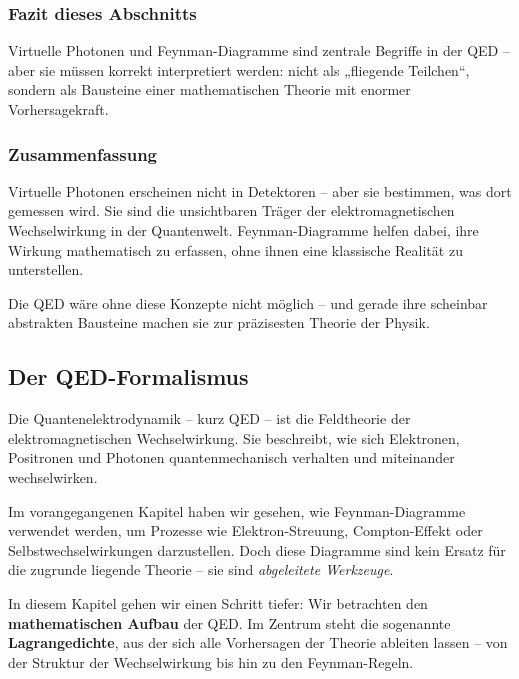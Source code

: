 \subsubsection*{Fazit dieses Abschnitts}
Virtuelle Photonen und Feynman-Diagramme sind zentrale Begriffe in der QED – aber sie müssen korrekt interpretiert werden: nicht als „fliegende Teilchen“, sondern als Bausteine einer mathematischen Theorie mit enormer Vorhersagekraft.

\subsubsection{Zusammenfassung}

Virtuelle Photonen erscheinen nicht in Detektoren – aber sie bestimmen, was dort gemessen wird. Sie sind die unsichtbaren Träger der elektromagnetischen Wechselwirkung in der Quantenwelt. Feynman-Diagramme helfen dabei, ihre Wirkung mathematisch zu erfassen, ohne ihnen eine klassische Realität zu unterstellen.

Die QED wäre ohne diese Konzepte nicht möglich – und gerade ihre scheinbar abstrakten Bausteine machen sie zur präzisesten Theorie der Physik.

\subsection{Der QED-Formalismus}

Die Quantenelektrodynamik – kurz QED – ist die Feldtheorie der elektromagnetischen Wechselwirkung. Sie beschreibt, wie sich Elektronen, Positronen und Photonen quantenmechanisch verhalten und miteinander wechselwirken.

Im vorangegangenen Kapitel haben wir gesehen, wie Feynman-Dia\-gramme verwendet werden, um Prozesse wie Elektron-Streuung, Compton-Effekt oder Selbstwechselwirkungen darzustellen. Doch diese Diagramme sind kein Ersatz für die zugrunde liegende Theorie – sie sind \emph{abgeleitete Werkzeuge}.

In diesem Kapitel gehen wir einen Schritt tiefer: Wir betrachten den \textbf{mathematischen Aufbau} der QED. Im Zentrum steht die sogenannte \textbf{Lagrangedichte}, aus der sich alle Vorhersagen der Theorie ableiten lassen – von der Struktur der Wechselwirkung bis hin zu den Feynman-Regeln.

